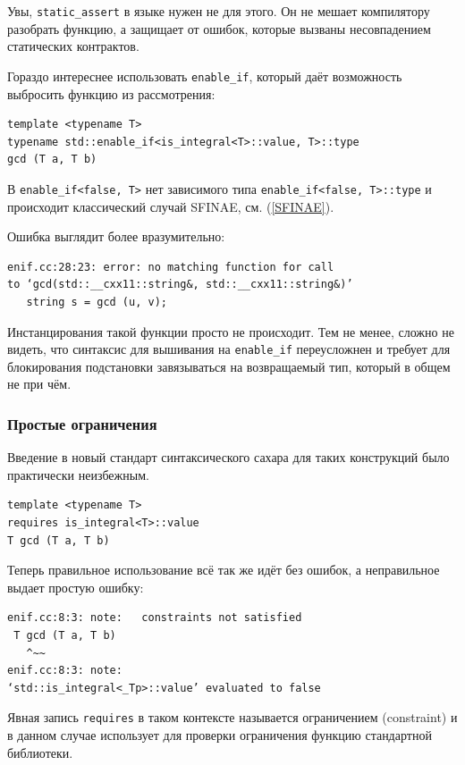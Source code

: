 \documentclass[a4paper,12pt,oneside]{article}
\begin{document}
Увы, \lstinline!static_assert! в языке нужен не для этого. Он не мешает компилятору разобрать функцию, а защищает от ошибок, которые вызваны несовпадением статических контрактов.

Гораздо интереснее использовать \lstinline!enable_if!, который даёт возможность выбросить функцию из рассмотрения:

\begin{lstlisting}
template <typename T>
typename std::enable_if<is_integral<T>::value, T>::type
gcd (T a, T b)
\end{lstlisting}

В \lstinline!enable_if<false, T>! нет зависимого типа \lstinline!enable_if<false, T>::type! и происходит классический случай SFINAE, см. (\ref{SFINAE}).

Ошибка выглядит более вразумительно:

\begin{verbatim}
enif.cc:28:23: error: no matching function for call 
to ‘gcd(std::__cxx11::string&, std::__cxx11::string&)’
   string s = gcd (u, v);
\end{verbatim}

Инстанцирования такой функции просто не происходит. Тем не менее, сложно не видеть, что синтаксис для вышивания на \lstinline!enable_if! переусложнен и требует для блокирования подстановки завязываться на возвращаемый тип, который в общем не при чём.

\subsubsection{Простые ограничения}\label{Constraints}

Введение в новый стандарт синтаксического сахара для таких конструкций было практически неизбежным.

\begin{lstlisting}
template <typename T>
requires is_integral<T>::value
T gcd (T a, T b)
\end{lstlisting}

Теперь правильное использование всё так же идёт без ошибок, а неправильное выдает простую ошибку:

\begin{verbatim}
enif.cc:8:3: note:   constraints not satisfied
 T gcd (T a, T b)
   ^~~
enif.cc:8:3: note:   
‘std::is_integral<_Tp>::value’ evaluated to false
\end{verbatim}

Явная запись \lstinline!requires! в таком контексте называется ограничением (constraint) и в данном случае использует для проверки ограничения функцию стандартной библиотеки.
\end{document}
